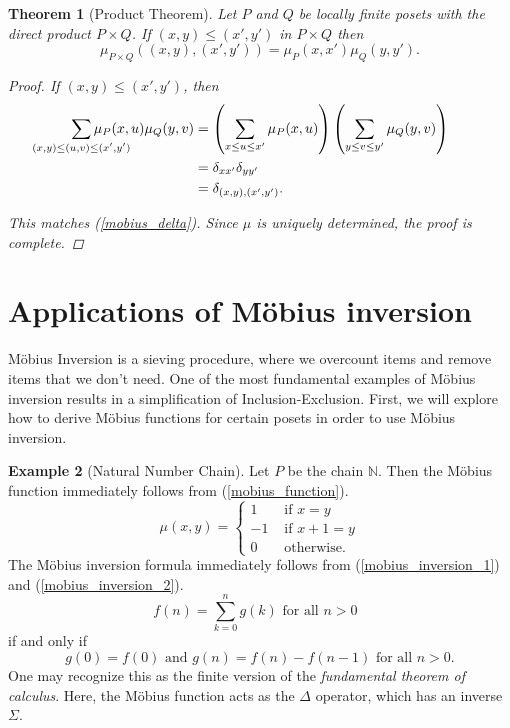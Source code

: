 \documentclass[psamsfonts]{amsart}
\newtheorem{thm}{Theorem}[section]
\theoremstyle{definition}
\newtheorem{exmp}[thm]{Example}
\theoremstyle{remark}
\numberwithin{equation}{section}
\begin{document}
\begin{thm}[Product Theorem]\label{Product Theorem}
Let $P$ and $Q$ be locally finite posets with the direct product $P\times Q$. If $(x,y)\leq (x',y')$ in $P\times Q$ then
\begin{equation}
    \mu_{P\times Q}((x,y),(x',y'))=\mu_P(x,x')\mu_Q(y,y').
\end{equation}
\begin{proof}
If $(x,y)\leq (x',y')$, then 
\begin{align*}
    \sum_{\mathclap{(x,y)\leq (u,v)\leq (x',y')}} \mu_P(x,u)\mu_Q(y,v)&= \left(\sum_{x\leq u \leq x'}\mu_P(x,u)\right)\left(\sum_{y\leq v \leq y'}\mu_Q(y,v)\right)\\
    &= \delta_{xx'}\delta_{yy'}\\
    &=\delta_{(x,y),(x',y')}.
\end{align*}

This matches (\ref{mobius_delta}). Since $\mu$ is uniquely determined, the proof is complete.
\end{proof}
\end{thm}

\section{Applications of M\"{o}bius inversion}
\indent M\"{o}bius Inversion is a sieving procedure, where we overcount items and remove items that we don't need. One of the most fundamental examples of M\"{o}bius inversion results in a simplification of Inclusion-Exclusion. First, we will explore how to derive M\"{o}bius functions for certain posets in order to use M\"{o}bius inversion.
\begin{exmp}[Natural Number Chain]\label{natural_chain}
Let $P$ be the chain $\mathbb{N}$. Then the M\"{o}bius function immediately follows from (\ref{mobius_function}).
\[
\mu(x,y)=\begin{cases}
1 & \text{ if } x=y\\
-1 & \text{ if } x+1=y\\ 
0 & \text{ otherwise}.
\end{cases}
\]
The M\"{o}bius inversion formula immediately follows from (\ref{mobius_inversion_1}) and (\ref{mobius_inversion_2}).
\[
f(n)=\sum^n_{k=0}g(k) \text{ for all $n>0$ }
\]
if and only if 
\[
g(0)=f(0) \text{ and } g(n)=f(n)-f(n-1) \text{ for all } n>0.
\]
One may recognize this as the finite version of the \textit{fundamental theorem of calculus}. Here, the M\"{o}bius function acts as the $\Delta$ operator, which has an inverse $\Sigma$. 
\end{exmp}
\end{document}
